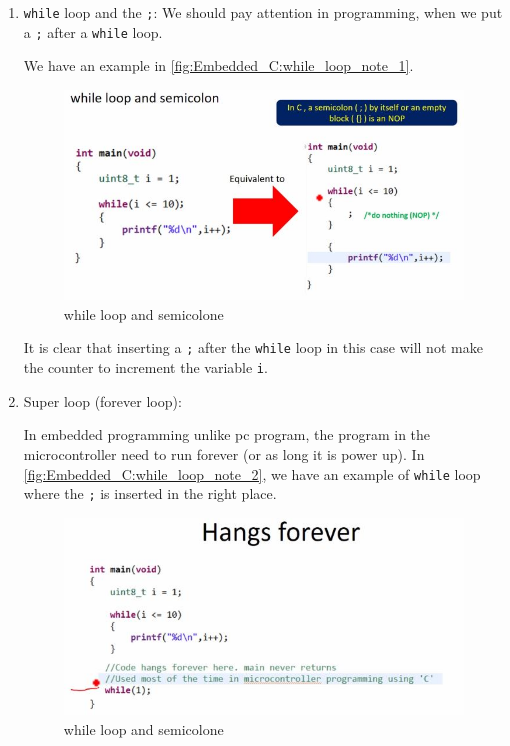 \begin{enumerate}
    
    \item \verb|while| loop and the \verb|;|: We should pay attention in programming, when we put a \verb|;| after a \verb|while| loop.
    
    We have an example in \autoref{fig:Embedded_C:while_loop_note_1}.
    
    \begin{figure}[h]
\centering
\includegraphics[scale=0.7]{Figures/Embedded_C/while_loop_note_1}
\caption{while loop and semicolone}
\label{fig:Embedded_C:while_loop_note_1}
\end{figure}

It is clear that inserting a \verb|;| after the \verb|while| loop in this case will not make the counter to increment the variable \verb|i|.\\

 \item Super loop (forever loop): 
 
 In embedded programming unlike pc program, the program in the microcontroller need to run forever (or as long it is power up). In \autoref{fig:Embedded_C:while_loop_note_2}, we have an example of \verb|while| loop where the \verb|;| is inserted in the right place.
    
\begin{figure}[h]
\centering
\includegraphics[scale=0.7]{Figures/Embedded_C/while_loop_note_2}
\caption{while loop and semicolone}
\label{fig:Embedded_C:while_loop_note_2}
\end{figure}    
    

\end{enumerate}
